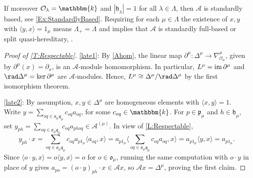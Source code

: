 \documentclass[a4paper,11pt]{amsart}
\let\<\langle
\let\>\rangle
\numberwithin{equation}{subsection}
\theoremstyle{definition}
\theoremstyle{theorem}
\theoremstyle{remark}
\newcommand\CA{\mathcal{A}}
\newcommand\CO{\mathcal{O}}
\newcommand\plam[1][\lambda]{\mathfrak{p}_{#1}}
\newcommand\hlam[1][\lambda]{\mathfrak{h}_{#1}}
\newcommand\qlam[1][\lambda]{\mathfrak{q}_{#1}}
\newcommand\Olam[1][\lambda]{\CO_{#1}}
\newcommand\olam[1][\lambda]{\mathfrak{o}_{#1}}
\newcommand\kk{\mathbbm{k}}
\begin{document}
\begin{Remark}
If moreover $\Olam=\kk$ and $|\hlam|=1$ for all $\lambda\in\Lambda$, then $\CA$ is standardly based, see \autoref{Ex:StandardlyBased}. Requiring for each $\mu\in\Lambda$ the existence of $x,y$ with $\<y,x\>=1_\mu$  means $\Lambda_+=\Lambda$ and implies that $\CA$ is standardly full-based \cite[Definition~1.3.1]{DuRui:strat} or split quasi-hereditary, \cite[Theorem~4.2.7]{DuRui:strat}.
\end{Remark}

   \begin{proof}[Proof of \autoref{T:Respectable}]
     \autoref{late1}: By \autoref{Ahom}, the linear map
     $\partial^\mu\colon\Delta^\mu\to\nabla^\mu_{\Olam[\mu]}$, given by
     $\partial^\mu(x)=\partial_x$, is an
     $\CA$-module homomorphism. In particular, $L^\mu=\mathop{\rm im}\partial^\mu$ and
     $\rad\Delta^\mu=\ker\partial^\mu$ are $\CA$-modules. Hence,
     $L^\mu\cong\Delta^\mu/\rad\Delta^\mu$ by the first isomorphism
     theorem.

     \autoref{late2}: By assumption, $x,y\in\Delta^\mu$ are homogeneous
     elements with $\<x,y\>=1$. Write
     $y=\sum_{oq\in\olam[\mu]\qlam[\mu]}c_{oq}a_{oq}$, for some
     $c_{oq}\in\kk$. For $p\in\plam[\mu]$ and $h\in\hlam[\mu]$,
     set $y_{ph}=\sum_{oq\in\olam[\mu]\qlam[\mu]}c_{oq}a_{phoq}\in
     \CA^{(\mu)}$. In view of \autoref{L:Respectable},
     \[
         y_{ph}\cdot x
           = \sum_{oq\in\olam[\mu]\qlam[\mu]}c_{oq}a_{p1_\mu}\<a_{oq},x\>
           =a_{p1_\mu}\biggl\<\sum_{oq\in\olam[\mu]\qlam[\mu]}c_{oq}a_{oq},x\biggr\>
           = a_{p1_\mu}\<y,x\> = a_{p1_\mu}.
     \]
     Since $\<o\cdot y,x\>=o\<y,x\>=o$ for $o\in\olam[\mu]$, running the same
     computation with $o\cdot y$ in place of $y$ gives $a_{po}=(o\cdot y)_{ph}\cdot x\in\CA x$, so
     $\CA x=\Delta^\mu$, proving the first claim.


\end{proof}
\end{document}
